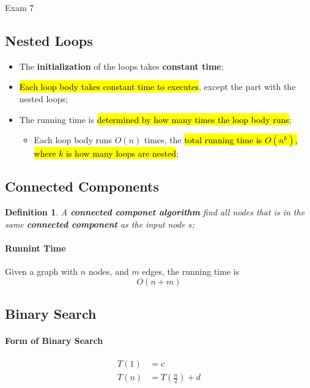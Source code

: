 \documentclass{note}
\newtheorem{definition}{Definition}
\begin{document}
\begin{note}{Exam 7}
    \subsection{Nested Loops}

    \begin{itemize}
        \item The \textbf{initialization} of the loops takes \textbf{constant time};
        \item \hl{Each loop body takes constant time to executes}, except the part with the nested loops;
        \item The running time is \hl{determined by how many times the loop body runs};
        \begin{itemize}
            \item Each loop body runs $ O \left( n \right) $ times, the \hl{total running time is $ O \left( n^{k} \right) $,
            where $ k $ is how many loops are nested};
        \end{itemize}
    \end{itemize}

    \subsection{Connected Components}

    \begin{definition}
        A \textbf{connected componet algorithm} find all nodes that is in the same \textbf{connected component}
        as the input node $ s $;
    \end{definition}

    \paragraph{Runnint Time}

    Given a graph with $ n $ nodes, and $ m $ edges, the running time is
    \begin{displaymath}
         O \left( n + m \right)
    \end{displaymath}

    \subsection{Binary Search}

    \paragraph{Form of Binary Search}
    \begin{align*}
        T(1) &= c \\
        T(n) &= T \left( \frac{n}{2} \right) + d
    \end{align*}


\end{note}
\end{document}
